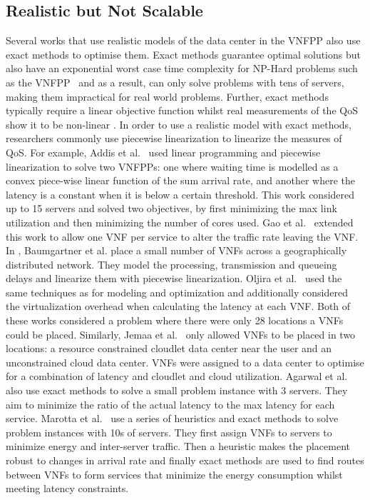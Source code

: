 \subsection{Realistic but Not Scalable}
Several works that use realistic models of the data center in the VNFPP also use exact methods to optimise them. Exact methods guarantee optimal solutions but also have an exponential worst case time complexity for NP-Hard problems such as the VNFPP~\cite{Landa-Silva13} and as a result, can only solve problems with tens of servers, making them impractical for real world problems. Further, exact methods typically require a linear objective function whilst real measurements of the QoS show it to be non-linear \cite{IntelDPDK, IntelPPP}. In order to use a realistic model with exact methods, researchers commonly use piecewise linearization to linearize the measures of QoS. For example, Addis et al.~\cite{AddisBBS15} used linear programming and piecewise linearization to solve two VNFPPs: one where waiting time is modelled as a convex piece-wise linear function of the sum arrival rate, and another where the latency is a constant when it is below a certain threshold. This work considered up to 15 servers and solved two objectives, by first minimizing the max link utilization and then minimizing the number of cores used. Gao et al.~\cite{GaoABS18} extended this work to allow one VNF per service to alter the traffic rate leaving the VNF. In \cite{BaumgartnerRB15}, Baumgartner et al. place a small number of VNFs across a geographically distributed network. They model the processing, transmission and queueing delays and linearize them with piecewise linearization. Oljira et al.~\cite{OljiraGTB17} used the same techniques as \cite{BaumgartnerRB15} for modeling and optimization and additionally considered the virtualization overhead when calculating the latency at each VNF. Both of these works considered a problem where there were only 28 locations a VNFs could be placed. Similarly, Jemaa et al.~\cite{JemaaPP16} only allowed VNFs to be placed in two locations: a resource constrained cloudlet data center near the user and an unconstrained cloud data center. VNFs were assigned to a data center to optimise for a combination of latency and cloudlet and cloud utilization. Agarwal et al.~\cite{AgarwalMCD18} also use exact methods to solve a small problem instance with 3 servers. They aim to minimize the ratio of the actual latency to the max latency for each service. Marotta et al.~\cite{MarottaZDK17} use a series of heuristics and exact methods to solve problem instances with 10s of servers. They first assign VNFs to servers to minimize energy and inter-server traffic. Then a heuristic makes the placement robust to changes in arrival rate and finally exact methods are used to find routes between VNFs to form services that minimize the energy consumption whilst meeting latency constraints.

